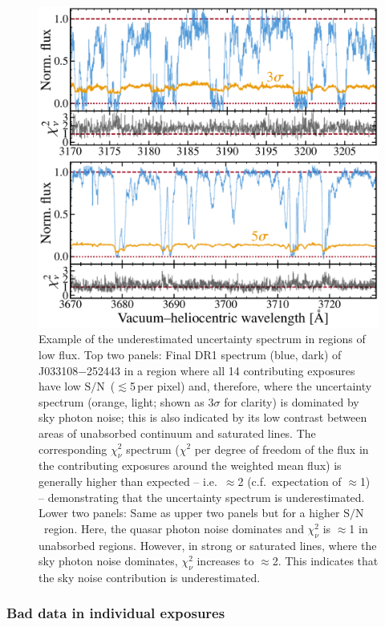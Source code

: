 \documentclass[fleqn,usenatbib,usedcolumn]{mnras}
\renewcommand{\la}{\lesssim} %
\newcommand{\SN}{\ensuremath{\textrm{S/N}}}
\begin{document}
\begin{figure}
\begin{center}
\includegraphics[width=0.90\columnwidth]{DR1_unc_underestimate.pdf}
\vspace{-1em}
\caption{Example of the underestimated uncertainty spectrum in regions of low flux. Top two panels: Final DR1 spectrum (blue, dark) of J033108$-$252443 in a region where all 14 contributing exposures have low \SN\ ($\la$5\,per pixel) and, therefore, where the uncertainty spectrum (orange, light; shown as 3$\sigma$ for clarity) is dominated by sky photon noise; this is also indicated by its low contrast between areas of unabsorbed continuum and saturated lines. The corresponding $\chi^2_\nu$ spectrum ($\chi^2$ per degree of freedom of the flux in the contributing exposures around the weighted mean flux) is generally higher than expected -- i.e.\ $\approx$2 (c.f.\ expectation of $\approx$1) -- demonstrating that the uncertainty spectrum is underestimated. Lower two panels: Same as upper two panels but for a higher \SN\ region. Here, the quasar photon noise dominates and $\chi^2_\nu$ is $\approx$1 in unabsorbed regions. However, in strong or saturated lines, where the sky photon noise dominates, $\chi^2_\nu$ increases to $\approx$2. This indicates that the sky noise contribution is underestimated.}
\label{f:unc_underestimate}
\end{center}
\end{figure}

\subsubsection{Bad data in individual exposures}\label{sss:bad_data}
\end{document}
